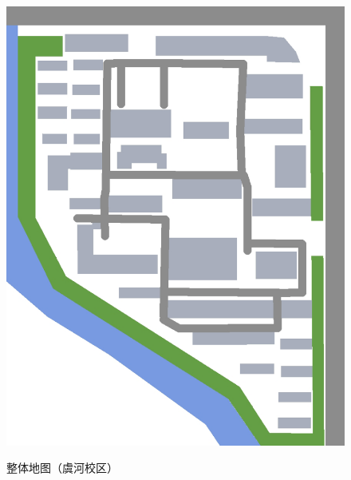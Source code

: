 \noindent\begin{figure}[H]
    \centering
    \caption[map_all]{整体地图（虞河校区）}
    \vspace{1em}
    \noindent\includegraphics*[width=\linewidth]{虞河校区地图.pdf}
    \label{map_y}
\end{figure}

